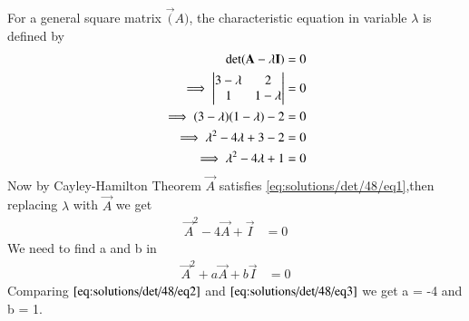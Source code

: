 For a general square matrix $\vec(A)$, the characteristic equation in variable $\lambda$  is defined by
\begin{align}
  \det({\mathbf{A}-\lambda \mathbf{I}}) &= 0\\
  \implies\begin{vmatrix}3-\lambda&2\\1&1-\lambda\end{vmatrix} &= 0\\
  \implies(3-\lambda)(1-\lambda)-2 &= 0\\
  \implies\lambda^2-4\lambda+3-2 &= 0\\
  \implies\lambda^2-4\lambda+1 &= 0\label{eq:solutions/det/48/eq1}
\end{align}
Now by Cayley-Hamilton Theorem $\vec{A}$ satisfies \eqref{eq:solutions/det/48/eq1},then replacing $\lambda$ with $\vec{A}$ we get
\begin{align}
  \vec{A}^2-4\vec{A}+\vec{I} &= 0\label{eq:solutions/det/48/eq2}
\end{align}
We need to find a and b in
\begin{align}
  \vec{A}^2+a\vec{A}+b\vec{I} &= 0\label{eq:solutions/det/48/eq3}
\end{align}
Comparing $\eqref{eq:solutions/det/48/eq2}$ and $\eqref{eq:solutions/det/48/eq3}$ we get a = -4 and b = 1.
